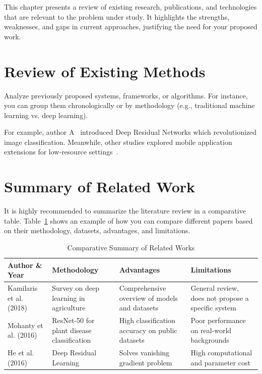 This chapter presents a review of existing research, publications, and technologies that are relevant to the problem under study. It highlights the strengths, weaknesses, and gaps in current approaches, justifying the need for your proposed work.

\section{Review of Existing Methods}
Analyze previously proposed systems, frameworks, or algorithms. For instance, you can group them chronologically or by methodology (e.g., traditional machine learning vs. deep learning).

For example, author A~\cite{he2016deep} introduced Deep Residual Networks which revolutionized image classification. Meanwhile, other studies explored mobile application extensions for low-resource settings~\cite{munoz2018ict}.

\section{Summary of Related Work}
It is highly recommended to summarize the literature review in a comparative table. Table~\ref{tab:lit-summary} shows an example of how you can compare different papers based on their methodology, datasets, advantages, and limitations.

\begin{table}[h]
    \centering
    \caption{Comparative Summary of Related Works}
    \label{tab:lit-summary}
    \begin{tabularx}{\textwidth}{l p{3.5cm} X p{3.5cm}}
        \toprule
        \textbf{Author \& Year} & \textbf{Methodology} & \textbf{Advantages} & \textbf{Limitations} \\
        \midrule
        Kamilaris et al. (2018)~\cite{kamilaris2018deep} & Survey on deep learning in agriculture & Comprehensive overview of models and datasets & General review, does not propose a specific system \\
        Mohanty et al. (2016)~\cite{mohanty2016plant} & ResNet-50 for plant disease classification & High classification accuracy on public datasets & Poor performance on real-world backgrounds \\
        He et al. (2016)~\cite{he2016deep} & Deep Residual Learning & Solves vanishing gradient problem & High computational and parameter cost \\
        \bottomrule
    \end{tabularx}
\end{table}

